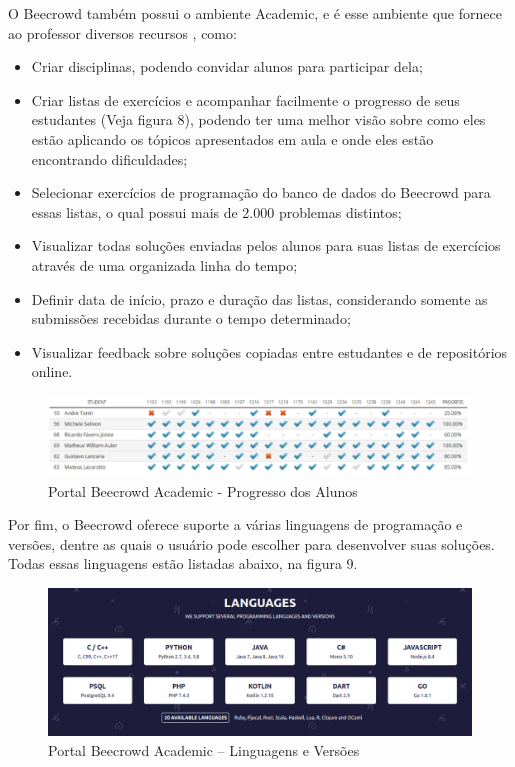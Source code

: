 O Beecrowd também possui o ambiente Academic, e é esse ambiente que fornece ao professor diversos recursos \cite{beecrowdacademic}, como:

\begin{itemize}
    \item Criar disciplinas, podendo convidar alunos para participar dela;
    \item Criar listas de exercícios e acompanhar facilmente o progresso de seus estudantes (Veja figura 8), podendo ter uma melhor visão sobre como eles estão aplicando os tópicos apresentados em aula e onde eles estão encontrando dificuldades;
    \item Selecionar exercícios de programação do banco de dados do Beecrowd para essas listas, o qual possui mais de 2.000 problemas distintos;
    \item Visualizar todas soluções enviadas pelos alunos para suas listas de exercícios através de uma organizada linha do tempo;
    \item Definir data de início, prazo e duração das listas, considerando somente as submissões recebidas durante o tempo determinado;
    \item Visualizar feedback sobre soluções copiadas entre estudantes e de repositórios online.
\end{itemize}

\begin{figure}[h!]
	   \centering
            \caption{Portal Beecrowd Academic - Progresso dos Alunos}
            \label{fig:ModeloConceitual}
	   	\includegraphics[scale=0.3]{pictures/beecrowd_academic_progresso.png}
\end{figure}

Por fim, o Beecrowd oferece suporte a várias linguagens de programação e versões, dentre as quais o usuário pode escolher para desenvolver suas soluções. Todas essas linguagens estão listadas abaixo, na figura 9.

\begin{figure}[h!]
	   \centering
            \caption{Portal Beecrowd Academic – Linguagens e Versões}
            \label{fig:ModeloConceitual}
	   	\includegraphics[scale=0.3]{pictures/beecrowd_academic_linguagens.png}
\end{figure}

